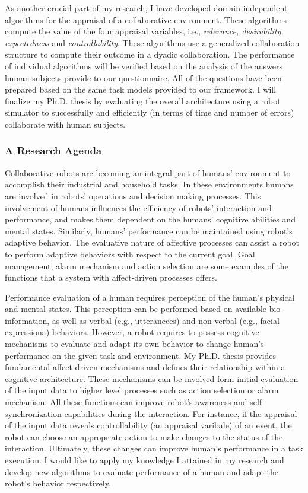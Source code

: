 \documentclass[a4paper, 10pt]{article}
\begin{document}
\begin{small}
As another crucial part of my research, I have developed domain-independent
algorithms for the appraisal of a collaborative environment. These algorithms
compute the value of the four appraisal variables, i.e., \textit{relevance,
desirability, expectedness} and \textit{controllability}. These algorithms use a
generalized collaboration structure to compute their outcome in a dyadic
collaboration. The performance of individual algorithms will be verified based
on the analysis of the answers human subjects provide to our questionnaire. All
of the questions have been prepared based on the same task models provided to
our framework. I will finalize my Ph.D. thesis by evaluating the overall
architecture using a robot simulator to successfully and efficiently (in terms
of time and number of errors) collaborate with human subjects.

\subsubsection*{A Research Agenda}

Collaborative robots are becoming an integral part of humans' environment to
accomplish their industrial and household tasks. In these environments humans
are involved in robots' operations and decision making processes. This
involvement of humans influences the efficiency of robots' interaction and
performance, and makes them dependent on the humans' cognitive abilities and
mental states. Similarly, humans' performance can be maintained using robot's
adaptive behavior. The evaluative nature of affective processes can assist a
robot to perform adaptive behaviors with respect to the current goal. Goal
management, alarm mechanism and action selection are some examples of the
functions that a system with affect-driven processes offers.

Performance evaluation of a human requires perception of the human's physical
and mental states. This perception can be performed based on available
bio-information, as well as verbal (e.g., utterancces) and non-verbal (e.g.,
facial expressiona) behaviors. However, a robot requires to possess cognitive
mechanisms to evaluate and adapt its own behavior to change human's performance
on the given task and environment. My Ph.D. thesis provides fundamental
affect-driven mechanisms and defines their relationship within a cognitive
architecture. These mechanisms can be involved form initial evaluation of the
input data to higher level processes such as action selection or alarm
mechanism. All these functions can improve robot's awareness and
self-synchronization capabilities during the interaction. For instance, if the
appraisal of the input data reveals controllability (an appraisal varibale) of
an event, the robot can choose an appropriate action to make changes to
the status of the interaction. Ultimately, these changes can improve human's
performance in a task execution. I would like to apply my knowledge I attained
in my research and develop new algorithms to evaluate performance of a human and
adapt the robot's behavior respectively.






\vspace{0.5cm}

\end{small}
\end{document}
